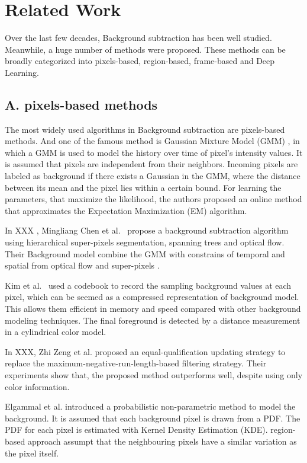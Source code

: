 \documentclass[journal]{IEEEtran}
\begin{document}
\section{Related Work}
Over the last few decades, Background subtraction has been well studied. Meanwhile, a huge number of methods were proposed. These methods can be broadly categorized into pixels-based, region-based, frame-based and Deep Learning.

\subsection{A. pixels-based methods}
\label{sec_spa}
The most widely used algorithms in Background subtraction are pixels-based methods.
And one of the famous method is Gaussian Mixture Model (GMM) \cite{Zivkovic2004}, in which a GMM is used to model the history over time of pixel’s intensity values.
It is assumed that pixels are independent from their neighbors.
Incoming pixels are labeled as background if there exists a Gaussian in the GMM, where the distance between its mean and the pixel lies within a certain bound.
For learning the parameters, that maximize the likelihood, the authors proposed an online method that approximates the Expectation Maximization (EM) algorithm.

In XXX , Mingliang Chen et al.\ \cite{2017_TPAMI_GANGWANG} propose a background subtraction algorithm using hierarchical super-pixels segmentation, spanning trees and optical flow.
Their Background model combine the GMM with constrains of temporal and spatial from optical flow and super-pixels \cite{6205760_2012_TPAMI}.

Kim et al.\ \cite{Kim2004} used a codebook to record the sampling background values at each pixel, which can be seemed as a compressed representation of background model.
This allows them efficient in memory and speed compared with other background modeling techniques.
The final foreground is detected by a distance measurement in a cylindrical color model.

In XXX, Zhi Zeng et al.
proposed an equal-qualification updating strategy to replace the maximum-negative-run-length-based filtering strategy.
Their experiments show that, the proposed method outperforms well, despite using only color information.

Elgammal et al.
introduced a probabilistic non-parametric method to model the background.
It is assumed that each background pixel is drawn from a PDF.
The PDF for each pixel is estimated with Kernel Density Estimation (KDE).
\label{sec_geo}
region-based approach assumpt that the neighbouring pixels have a similar variation as the pixel itself.
\end{document}
